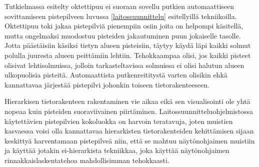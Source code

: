 Tutkielmassa esitelty oktettipuu ei suoraan sovellu putkien automaattiseen sovittamiseen pistepilveen luvussa \ref{laitossuunnittelu} esitellyillä tekniikoilla. Oktettipuu toki jakaa pistepilviä pienempiin osiin joita on helpompi käsitellä, mutta ongelmaksi muodostuu pisteiden jakautuminen puun jokaiselle tasolle. Jotta päästäisiin käsiksi tietyn alueen pisteisiin, täytyy käydä läpi kaikki solmut polulla juuresta alueen peittämiin lehtiin. Tehokkaampaa olisi, jos kaikki pisteet olisivat lehtisolmuissa, jolloin tarkasteltavissa solmuissa ei olisi halutun alueen ulkopuolisia pisteitä. Automaattista putkenreititystä varten olisikin ehkä kannattavaa järjestää pistepilvi johonkin toiseen tietorakenteeseen. 

Hierarkisen tietorakenteen rakentaminen vie aikaa eikä sen visualisointi ole yhtä nopeaa kuin pisteiden suoraviivainen piirtäminen. Laitossuunnitteluohjelmistossa käytettävien pistepilvien kokoluokka on harvoin teratavuja, joten muistien kasvaessa voisi olla kannattavaa hierarkisten tietorakenteiden kehittämisen sijaan keskittyä harventamaan pistepilveä niin, että se mahtuu näytönohjaimen muistiin ja käyttää jotakin ei-hierarkista tekniikkaa, joka käyttää näytönohjaimen rinnakkaislaskentatehoa mahdollisimman tehokkaasti.%

